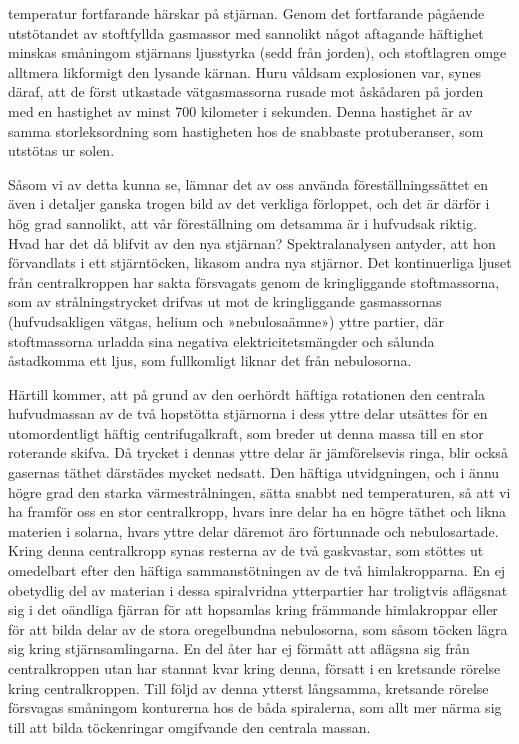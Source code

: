 \documentclass[a4paper, 12pt, oneside, swedish]{article}
\begin{document}
temperatur fortfarande härskar på stjärnan. Genom det fortfarande pågående utstötandet av stoftfyllda gasmassor med sannolikt något aftagande häftighet minskas småningom stjärnans ljusstyrka (sedd från jorden), och stoftlagren omge alltmera likformigt den lysande kärnan. Huru våldsam explosionen var, synes däraf, att de först utkastade vätgasmassorna rusade mot åskådaren på jorden med en hastighet av minst 700 kilometer i sekunden. Denna hastighet är av samma storleksordning som hastigheten hos de snabbaste protuberanser, som utstötas ur solen.

Såsom vi av detta kunna se, lämnar det av oss använda föreställningssättet en även i detaljer ganska trogen bild av det verkliga förloppet, och det är därför i hög grad sannolikt, att vår föreställning om detsamma är i hufvudsak riktig. Hvad har det då blifvit av den nya stjärnan? Spektralanalysen antyder, att hon förvandlats i ett stjärntöcken, likasom andra nya stjärnor. Det kontinuerliga ljuset från centralkroppen har sakta försvagats genom de kringliggande stoftmassorna, som av strålningstrycket drifvas ut mot de kringliggande gasmassornas (hufvudsakligen vätgas, helium och »nebulosaämne») yttre partier, där stoftmassorna urladda sina negativa elektricitetsmängder och sålunda åstadkomma ett ljus, som fullkomligt liknar det från nebulosorna.

Härtill kommer, att på grund av den oerhördt häftiga rotationen den centrala hufvudmassan av de två hopstötta stjärnorna i dess yttre delar utsättes för en utomordentligt häftig centrifugalkraft, som breder ut denna massa till en stor roterande skifva. Då trycket i dennas yttre delar är jämförelsevis ringa, blir också gasernas täthet därstädes mycket nedsatt. Den häftiga utvidgningen, och i ännu högre grad den starka värmestrålningen, sätta snabbt ned temperaturen, så att vi ha framför oss en stor centralkropp, hvars inre delar ha en högre täthet och likna materien i solarna, hvars yttre delar däremot äro förtunnade och nebulosartade. Kring denna centralkropp synas resterna av de två gaskvastar, som stöttes ut omedelbart efter den häftiga sammanstötningen av de två himlakropparna. En ej obetydlig del av materian i dessa spiralvridna ytterpartier har troligtvis aflägsnat sig i det oändliga fjärran för att hopsamlas kring främmande himlakroppar eller för att bilda delar av de stora oregelbundna nebulosorna, som såsom töcken lägra sig kring stjärnsamlingarna. En del åter har ej förmått att aflägsna sig från centralkroppen utan har stannat kvar kring denna, försatt i en kretsande rörelse kring centralkroppen. Till följd av denna ytterst långsamma, kretsande rörelse försvagas småningom konturerna hos de båda spiralerna, som allt mer närma sig till att bilda töckenringar omgifvande den centrala massan.
\end{document}
